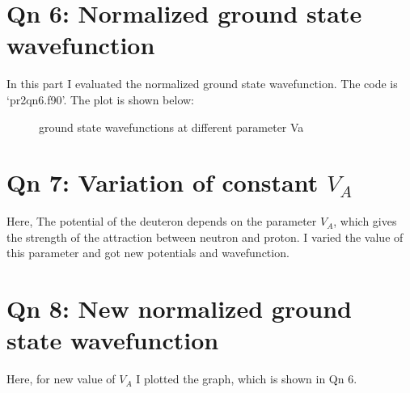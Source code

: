 \documentclass[11pt,a4paper,english]{article}
\begin{document}
\section{Qn 6: Normalized ground state wavefunction }
    In this part I evaluated the normalized ground state wavefunction.
    The code is `pr2qn6.f90'. The plot is shown below:\\
\begin{figure}[!ht]
\hfill
{}
\hfill
{}
\hfill
\caption{ground state wavefunctions at different parameter Va }
\end{figure}
    

\section{Qn 7: Variation of constant $V_A$ }
    Here, The potential of the deuteron depends on the parameter $V_A$, which gives
    the strength of the attraction between neutron and proton. I varied the value 
    of this parameter and got new potentials and wavefunction.

\section{Qn 8: New normalized ground state wavefunction }
    Here, for new value of $V_A$ I plotted the graph, which is shown in Qn 6.
\end{document}
